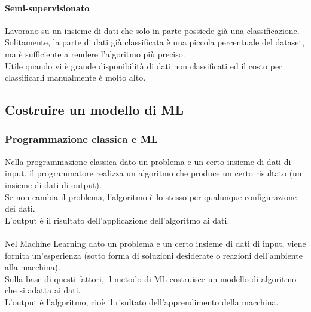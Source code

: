 \documentclass[../main.tex]{subfiles}
\begin{document}
	\paragraph{Semi-supervisionato} 
	Lavorano su un insieme di dati che solo in parte possiede già una classificazione. \\
	Solitamente, la parte di dati già classificata è una piccola percentuale del dataset, ma è sufficiente a rendere l'algoritmo più preciso. \\
	Utile quando vi è grande disponibilità di dati non classificati ed il costo per classificarli manualmente è molto alto.
	\subsection{Costruire un modello di ML}
	\subsubsection{Programmazione classica e ML}
	Nella programmazione classica dato un problema e un certo insieme di dati di input, il programmatore realizza un algoritmo che produce un certo risultato (un insieme di dati di output). \\
	Se non cambia il problema, l'algoritmo è lo stesso per qualunque configurazione dei dati. \\
	L'output è il risultato dell'applicazione dell'algoritmo ai dati.\\\\
	Nel Machine Learning dato un problema e un certo insieme di dati di input, viene fornita un'esperienza (sotto forma di soluzioni desiderate o reazioni dell'ambiente alla macchina). \\
	Sulla base di questi fattori, il metodo di ML costruisce un modello di algoritmo che si adatta ai dati. \\
	L'output è l'algoritmo, cioè il risultato dell'apprendimento della macchina.
\end{document}
